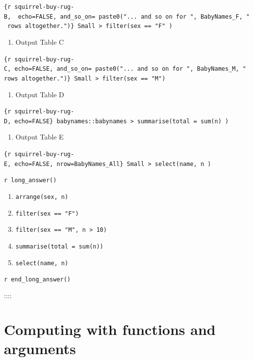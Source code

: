 \documentclass[
  letterpaper,
  DIV=11,
  numbers=noendperiod,
  oneside]{scrartcl}
\providecommand{\tightlist}{%
  \setlength{\itemsep}{0pt}\setlength{\parskip}{0pt}}\usepackage{longtable,booktabs,array}
\begin{document}
\begin{tcolorbox}
\texttt{\{r\ squirrel-buy-rug-B,\ \ echo=FALSE,\ and\_so\_on=\ paste0("...\ and\ so\ on\ for\ ",\ BabyNames\_F,\ "\ rows\ altogether.")\}\ Small\ \textbar{}\textgreater{}\ filter(sex\ ==\ "F"\ )}

\begin{enumerate}
\def\labelenumi{\arabic{enumi}.}
\setcounter{enumi}{2}
\tightlist
\item
  Output Table C
\end{enumerate}

\texttt{\{r\ squirrel-buy-rug-C,\ echo=FALSE,\ and\_so\_on=\ paste0("...\ and\ so\ on\ for\ ",\ BabyNames\_M,\ "\ rows\ altogether.")\}\ Small\ \textbar{}\textgreater{}\ filter(sex\ ==\ "M")}

\begin{enumerate}
\def\labelenumi{\arabic{enumi}.}
\setcounter{enumi}{3}
\tightlist
\item
  Output Table D
\end{enumerate}

\texttt{\{r\ squirrel-buy-rug-D,\ echo=FALSE\}\ babynames::babynames\ \textbar{}\textgreater{}\ summarise(total\ =\ sum(n)\ )}

\begin{enumerate}
\def\labelenumi{\arabic{enumi}.}
\setcounter{enumi}{4}
\tightlist
\item
  Output Table E
\end{enumerate}

\texttt{\{r\ squirrel-buy-rug-E,\ echo=FALSE,\ nrow=BabyNames\_All\}\ Small\ \textbar{}\textgreater{}\ select(name,\ n\ )}

\texttt{r\ long\_answer()}

\begin{enumerate}
\def\labelenumi{\alph{enumi}.}
\tightlist
\item
  \texttt{arrange(sex,\ n)}
\item
  \texttt{filter(sex\ ==\ "F")}
\item
  \texttt{filter(sex\ ==\ "M",\ n\ \textgreater{}\ 10)}
\item
  \texttt{summarise(total\ =\ sum(n))}
\item
  \texttt{select(name,\ n)}
\end{enumerate}

\texttt{r\ end\_long\_answer()}

\end{tcolorbox}

::::

\newpage

\section{Computing with functions and
arguments}\label{sec-data-computing}
\end{document}
